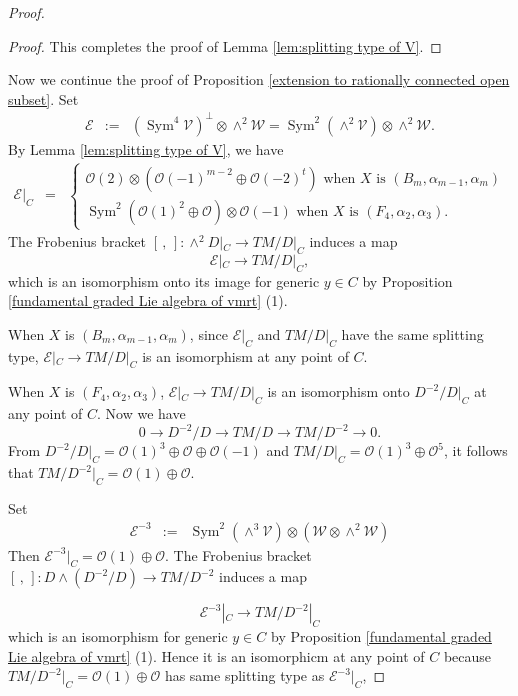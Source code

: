 \documentclass[12pt]{amsart}
\theoremstyle{plain}
\theoremstyle{definition}
\def\Sym{\operatorname{Sym}}
\begin{document}
\begin{proof}
\begin{proof}
This completes the proof of Lemma \ref{lem:splitting type of V}.
\end{proof}

\medskip
Now we continue the proof of Proposition \ref{extension to rationally connected open subset}.
Set
\begin{eqnarray*}
\mathcal E &:=&(\Sym^4\mathcal V)^{\perp} \otimes \wedge^2 \mathcal W = \Sym^2(\wedge^2 \mathcal V) \otimes \wedge^2 \mathcal W.
\end{eqnarray*}
By Lemma \ref{lem:splitting type of V}, we have
\begin{eqnarray*}
\mathcal E|_C
&=& \left\{\begin{array}{l}
 \mathcal O(2) \otimes (\mathcal O(-1)^{m-2} \oplus \mathcal O(-2)^t)   \text{ when } X \text{ is } (B_m, \alpha_{m-1}, \alpha_m) \\[5 pt]
\Sym^2 (\mathcal O(1)^2 \oplus \mathcal O) \otimes \mathcal O(-1)   \text{ when } X \text{ is } (F_4, \alpha_2, \alpha_3).
\end{array}\right.
\end{eqnarray*}
The Frobenius bracket $[\,,\,]:\wedge^2D|_C \rightarrow TM/D|_C$ induces a map
$$ \mathcal E |_C \rightarrow TM/D|_C, $$
which is an isomorphism onto its image for generic $y \in C$ by Proposition \ref{fundamental graded Lie algebra of vmrt} (1).

When $X$ is $(B_m, \alpha_{m-1}, \alpha_m)$, since $\mathcal E|_C$ and $TM/D|_C$ have the same splitting type, $\mathcal E|_C \rightarrow TM/D|_C$ is an isomorphism at any point of $C$.

When $X$ is $(F_4, \alpha_2, \alpha_3)$, $\mathcal E|_C \rightarrow TM/D|_C$ is an isomorphism onto $D^{-2}/D|_C$ at any point of $C$.
Now we have
$$0 \rightarrow D^{-2}/D \rightarrow TM/D \rightarrow TM/D^{-2} \rightarrow 0.$$
From $D^{-2}/D|_C=\mathcal O(1)^3 \oplus \mathcal O \oplus \mathcal O(-1)$ and $TM/D|_C=\mathcal O(1)^3 \oplus \mathcal O^5$, it follows that $TM/D^{-2}|_C= \mathcal O(1) \oplus \mathcal O$.

Set
\begin{eqnarray*}
 \mathcal E^{-3}&:=&\Sym^2(\wedge^3\mathcal V) \otimes (\mathcal W \otimes \wedge^2 \mathcal W)
\end{eqnarray*}
Then $\mathcal E^{-3}|_C = \mathcal O(1) \oplus \mathcal O$.
The Frobenius  bracket $[\,,\,]:D \wedge   (D^{-2}/D) \rightarrow  TM /D^{-2}$ induces a map

$$\mathcal E^{-3}|_C \rightarrow  TM  /D^{-2}|_{C} $$
which is an isomorphism for generic $y \in C$ by Proposition \ref{fundamental graded Lie algebra of vmrt} (1). Hence it  is an isomorphicm at any point of $C$ because  $TM/D^{-2}|_C =\mathcal O(1) \oplus \mathcal O$   has same splitting type as $\mathcal E^{-3}|_C$,


\end{proof}
\end{document}
